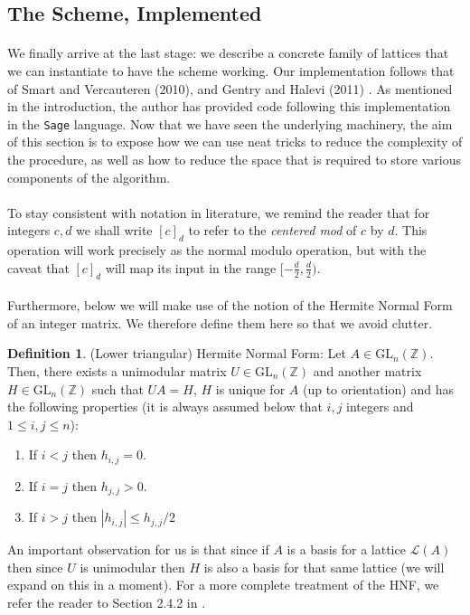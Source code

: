 \documentclass{article}
\theoremstyle{definition}
\newtheorem{definition}{Definition}[section]
\theoremstyle{example}
\renewcommand{\L}{\mathcal{L}}
\newcommand{\Int}{\mathbb{Z}}
\newcommand{\GL}{\text{GL}}
\begin{document}
\subsection{The Scheme, Implemented}
\label{sec:scheme_impl}
\paragraph{} We finally arrive at the last stage: we describe a concrete family
of lattices that we can instantiate to have the scheme working. Our
implementation follows that of Smart and Vercauteren \cite{smartImplementation}
(2010), and Gentry and Halevi (2011) \cite{gentryImplementation}. As mentioned
in the introduction, the author has provided code following this implementation
in the \texttt{Sage} language. Now that we have seen the underlying machinery,
the aim of this section is to expose how we can use neat tricks to reduce the
complexity of the procedure, as well as how to reduce the space that is required
to store various components of the algorithm.
\paragraph{} To stay consistent with notation in literature, we remind the
reader that for integers $c, d$ we shall write $[c]_d$ to refer to the
\textit{centered mod} of $c$ by $d$. This operation will work precisely as the
normal modulo operation, but with the caveat that $[c]_d$ will map its input in
the range $[-\frac{d}2, \frac{d}2)$.
\paragraph{} Furthermore, below we will make use of the notion of the Hermite
Normal Form of an integer matrix. We therefore define them here so that we avoid
clutter.
\begin{definition}{(Lower triangular) Hermite Normal Form:}
  Let $A \in \GL_n(\Int)$. Then, there exists a unimodular matrix $U \in
  \GL_n(\Int)$ and another matrix $H \in \GL_n(\Int)$ such that $UA = H$, $H$ is
  unique for $A$ (up to orientation) and has the following properties (it is
  always assumed below that $i, j$ integers and $1 \leq i, j \leq n$):
  \begin{enumerate}
    \item If $i < j$ then $h_{i, j} = 0$.
    \item If $i = j$ then $h_{j, j} > 0$.
    \item If $i > j$ then $|h_{i, j}| \leq h_{j, j}/2$
  \end{enumerate}
\end{definition}
An important observation for us is that since if $A$ is a basis for a lattice
$\L(A)$ then since $U$ is unimodular then $H$ is also a basis for that same
lattice (we will expand on this in a moment). For a more complete treatment of
the HNF, we refer the reader to Section 2.4.2 in \cite{cohen1993course}.
\end{document}
